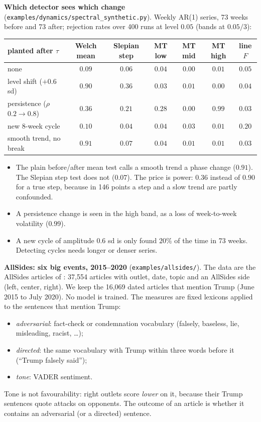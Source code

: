 \documentclass[11pt]{article}
\theoremstyle{definition}
\theoremstyle{remark}
\begin{document}
\textbf{Which detector sees which change} (\texttt{examples/dynamics/spectral\_synthetic.py}). Weekly AR(1) series, 73 weeks before and 73 after; rejection rates over 400 runs at level $0.05$ (bands at $0.05/3$):
\begin{center}\small
\begin{tabular}{lcccccc}
\toprule
planted after $\tau$ & Welch mean & Slepian step & MT low & MT mid & MT high & line $F$\\
\midrule
none & $0.09$ & $0.06$ & $0.04$ & $0.00$ & $0.01$ & $0.05$\\
level shift ($+0.6$ sd) & $\mathbf{0.90}$ & $\mathbf{0.36}$ & $0.03$ & $0.01$ & $0.00$ & $0.04$\\
persistence ($\rho$ $0.2\to0.8$) & $0.36$ & $0.21$ & $0.28$ & $0.00$ & $\mathbf{0.99}$ & $0.03$\\
new 8-week cycle & $0.10$ & $0.04$ & $0.04$ & $0.03$ & $0.01$ & $\mathbf{0.20}$\\
smooth trend, no break & $0.91$ & $0.07$ & $0.04$ & $0.01$ & $0.01$ & $0.03$\\
\bottomrule
\end{tabular}
\end{center}
\begin{itemize}
  \item The plain before/after mean test calls a smooth trend a phase change ($0.91$). The Slepian step test does not ($0.07$). The price is power: $0.36$ instead of $0.90$ for a true step, because in 146 points a step and a slow trend are partly confounded.
  \item A persistence change is seen in the high band, as a loss of week-to-week volatility ($0.99$).
  \item A new cycle of amplitude $0.6$ sd is only found $20\%$ of the time in 73 weeks. Detecting cycles needs longer or denser series.
\end{itemize}

\textbf{AllSides: six big events, 2015--2020} (\texttt{examples/allsides/}). The data are the AllSides articles of \cite{baly}: 37{,}554 articles with outlet, date, topic and an AllSides side (left, center, right). We keep the 16{,}069 dated articles that mention Trump (June 2015 to July 2020). No model is trained. The measures are fixed lexicons applied to the sentences that mention Trump:
\begin{itemize}
  \item \emph{adversarial}: fact-check or condemnation vocabulary (falsely, baseless, lie, misleading, racist, \dots);
  \item \emph{directed}: the same vocabulary with Trump within three words before it (``Trump falsely said'');
  \item \emph{tone}: VADER sentiment.
\end{itemize}
Tone is not favourability: right outlets score \emph{lower} on it, because their Trump sentences quote attacks on opponents. The outcome of an article is whether it contains an adversarial (or a directed) sentence.
\end{document}
